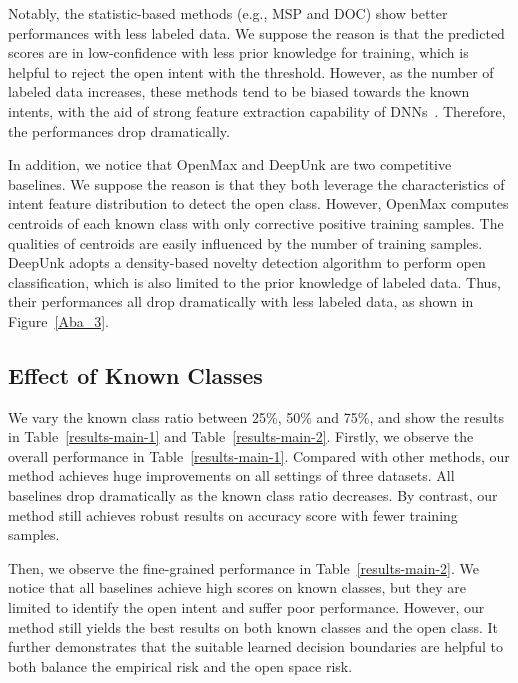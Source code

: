 \documentclass[letterpaper]{article} %
\begin{document}
Notably, the statistic-based methods (e.g., MSP and DOC) show better performances with less labeled data. We suppose the reason is that the predicted scores are in low-confidence with less prior knowledge for training, which is helpful to reject the open intent with the threshold. However, as the number of labeled data increases, these methods tend to be biased towards the known intents, with the aid of strong feature extraction capability of DNNs~\cite{7298640}. Therefore, the performances drop dramatically.


In addition, we notice that OpenMax and DeepUnk are two competitive baselines. We suppose the reason is that they both leverage the characteristics of intent feature distribution to detect the open class. However, OpenMax computes centroids of each known class with only corrective positive training samples. The qualities of centroids are easily influenced by the number of training samples. DeepUnk adopts a density-based novelty detection algorithm to perform open classification, which is also limited to the prior knowledge of labeled data. Thus, their performances all drop dramatically with less labeled data, as shown in Figure~\ref{Aba_3}.


\vspace{-0.77mm}
\vspace{-1.91mm}
\subsection{Effect of Known Classes}
We vary the known class ratio between 25\%, 50\% and 75\%, and show the results in Table~\ref{results-main-1} and Table~\ref{results-main-2}. Firstly, we observe the overall performance in Table~\ref{results-main-1}. Compared with other methods, our method achieves huge improvements on all settings of three datasets. All baselines drop dramatically as the known class ratio decreases. By contrast, our method still achieves robust results on accuracy score with fewer training samples.

Then, we observe the fine-grained performance in Table~\ref{results-main-2}. We notice that all baselines achieve high scores on known classes, but they are limited to identify the open intent and suffer poor performance. However, our method still yields the best results on both known classes and the open class. It further demonstrates that the suitable learned decision boundaries are helpful to both balance the empirical risk and the open space risk.

\vspace{-1.15mm}
\vspace{-2.06mm}
\end{document}

